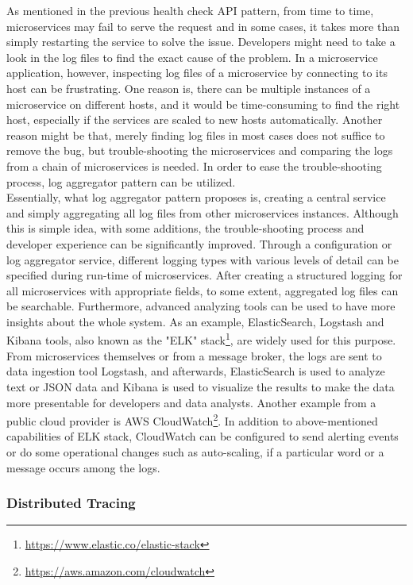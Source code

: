 \documentclass{Configuration_Files/PoliMi3i_thesis}
\begin{document}
As mentioned in the previous health check API pattern, from time to time, microservices may fail to serve the request and in some cases, it takes more than simply restarting the service to solve the issue.
Developers might need to take a look in the log files to find the exact cause of the problem.
In a microservice application, however, inspecting log files of a microservice by connecting to its host can be frustrating.
One reason is, there can be multiple instances of a microservice on different hosts, and it would be time-consuming to find the right host, especially if the services are scaled to new hosts automatically.
Another reason might be that, merely finding log files in most cases does not suffice to remove the bug, but trouble-shooting the microservices and comparing the logs from a chain of microservices is needed.
In order to ease the trouble-shooting process, log aggregator pattern can be utilized.
\\
Essentially, what log aggregator pattern proposes is, creating a central service and simply aggregating all log files from other microservices instances. Although this is simple idea, with some additions, the trouble-shooting process and developer experience can be significantly improved.
Through a configuration or log aggregator service, different logging types with various levels of detail can be specified during run-time of microservices.
After creating a structured logging for all microservices with appropriate fields, to some extent, aggregated log files can be searchable.
Furthermore, advanced analyzing tools can be used to have more insights about the whole system.
As an example, ElasticSearch, Logstash and Kibana tools, also known as the "ELK" stack\footnote{\href{https://www.elastic.co/elastic-stack}{https://www.elastic.co/elastic-stack}}, are widely used for this purpose.
From microservices themselves or from a message broker, the logs are sent to data ingestion tool Logstash, and afterwards, ElasticSearch is used to analyze text or JSON data and Kibana is used to visualize the results to make the data more presentable for developers and data analysts.
Another example from a public cloud provider is AWS CloudWatch\footnote{\href{https://aws.amazon.com/cloudwatch}{https://aws.amazon.com/cloudwatch}}.
In addition to above-mentioned capabilities of ELK stack, CloudWatch can be configured to send alerting events or do some operational changes such as auto-scaling, if a particular word or a message occurs among the logs.

\subsubsection{Distributed Tracing}
\label{subsubsec:distributed_tracing}
\end{document}
